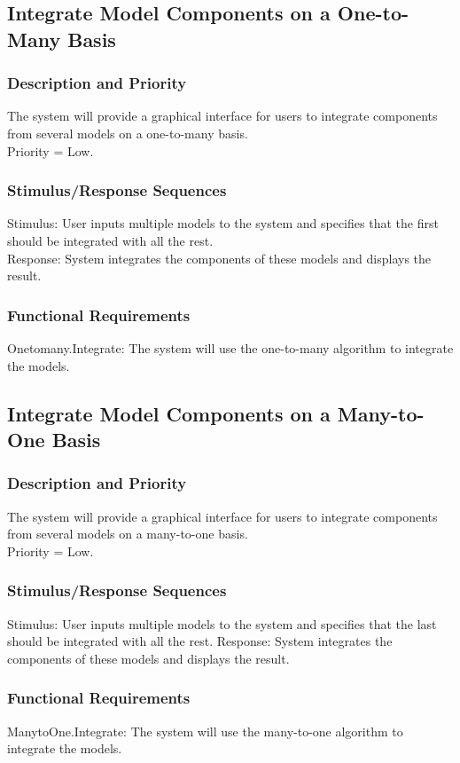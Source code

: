 \documentclass{article}
\begin{document}
\subsection{Integrate Model Components on a One-to-Many Basis}
\subsubsection{Description and Priority}
The system will provide a graphical interface for users to integrate components from several models on a one-to-many basis.\\
Priority = Low.

\subsubsection{Stimulus/Response Sequences}
Stimulus: User inputs multiple models to the system and specifies that the first should be integrated with all the rest.\\
Response: System integrates the components of these models and displays the result.

\subsubsection{Functional Requirements}
Onetomany.Integrate: The system will use the one-to-many algorithm to integrate the models.

\subsection{Integrate Model Components on a Many-to-One Basis}
\subsubsection{Description and Priority}
The system will provide a graphical interface for users to integrate components from several models on a many-to-one basis.\\
Priority = Low.

\subsubsection{Stimulus/Response Sequences}
Stimulus: User inputs multiple models to the system and specifies that the last should be integrated with all the rest.
Response: System integrates the components of these models and displays the result.

\subsubsection{Functional Requirements}
ManytoOne.Integrate: The system will use the many-to-one algorithm to integrate the models.
\end{document}
